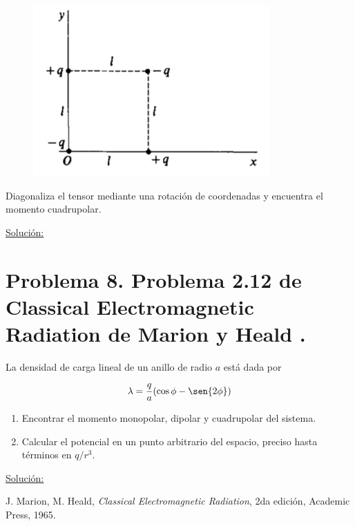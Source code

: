 \documentclass[a4paper,11pt]{article}
\numberwithin{equation}{section}
\begin{document}
\begin{figure}[H]
\center
 \includegraphics[scale=0.6]{problema7fig1}
\end{figure}

Diagonaliza el tensor mediante una rotación de coordenadas y encuentra el momento
cuadrupolar.

\vspace{.3cm}

\underline{Solución:} \vspace{.3cm}

\section{Problema 8. Problema 2.12 de Classical Electromagnetic Radiation
de Marion y Heald \cite{marion2}.}

La densidad de carga lineal de un anillo de radio $a$ está dada por 

$$
\lambda = \frac{q}{a}(\cos{\phi} - \sen{2\phi})
$$

\begin{enumerate}[label=\textbf{(\alph*)}]
\item Encontrar el momento monopolar, dipolar y cuadrupolar del sistema.
\item Calcular el potencial en un punto arbitrario del espacio, preciso hasta 
términos en $q/r^3$.
\end{enumerate}

\vspace{.3cm}

\underline{Solución:} \vspace{.3cm}

\begin{thebibliography}{10}
J. Marion, M. Heald, \emph{Classical Electromagnetic Radiation}, 2da edición, Academic 
Press, 1965.
\end{thebibliography}
\end{document}
